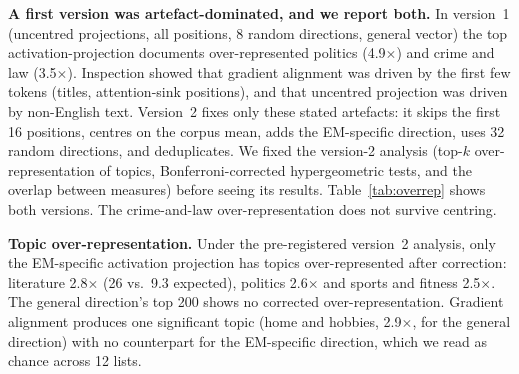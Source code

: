 \documentclass{article}
\begin{document}
\textbf{A first version was artefact-dominated, and we report both.} In version~1 (uncentred projections, all
positions, 8 random directions, general vector) the top activation-projection documents over-represented politics
(4.9$\times$) and crime and law (3.5$\times$). Inspection showed that gradient alignment was driven by the first few
tokens (titles, attention-sink positions), and that uncentred projection was driven by non-English text. Version~2
fixes only these stated artefacts: it skips the first 16 positions, centres on the corpus mean, adds the EM-specific
direction, uses 32 random directions, and deduplicates. We fixed the version-2 analysis (top-$k$ over-representation
of topics, Bonferroni-corrected hypergeometric tests, and the overlap between measures) before seeing its results.
Table~\ref{tab:overrep} shows both versions. The crime-and-law over-representation does not survive centring.

\begin{table}[t]
  \centering
  \caption{\textbf{Topic over-representation among the 200 highest-scoring documents.} Ratio = share of the topic in the
  top 200 divided by its share in the sample; observed/expected counts in parentheses; bold = Bonferroni-corrected
  hypergeometric $p<0.05$ over topics. v1: 48{,}829 documents, uncentred, all positions. v2: 45{,}849 documents,
  centred, positions $\ge16$, pre-registered. Only the v2 EM-specific activation projection gives a consistent topic
  signal; the single significant gradient-alignment topic is one of 12 lists tested.}
  \label{tab:overrep}
  \footnotesize
  
\end{table}

\textbf{Topic over-representation.} Under the pre-registered version~2 analysis, only the EM-specific activation
projection has topics over-represented after correction: literature 2.8$\times$ (26 vs.\ 9.3 expected), politics
2.6$\times$ and sports and fitness 2.5$\times$. The general direction's top 200 shows no corrected
over-representation. Gradient alignment produces one significant topic (home and hobbies, 2.9$\times$, for the
general direction) with no counterpart for the EM-specific direction, which we read as chance across 12 lists.
\end{document}
